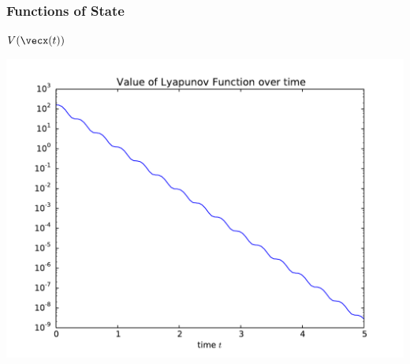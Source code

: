\documentclass[12pt]{beamer}
\begin{document}
\begin{frame}
\frametitle{Functions of State}

\centering
$V(\vecx(t))$

\includegraphics[width=.8\linewidth]{pic/smd_Vt}

\end{frame}
\end{document}
